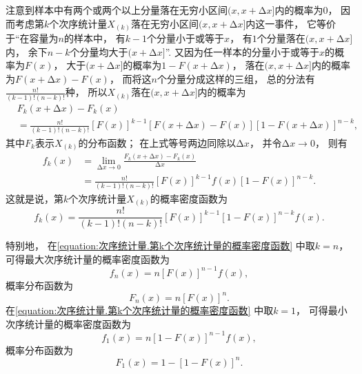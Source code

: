 注意到样本中有两个或两个以上分量落在无穷小区间\((x,x+\increment x]\)内的概率为\(0\)，
因而考虑第\(k\)个次序统计量\(X_{(k)}\)落在无穷小区间\((x,x+\increment x]\)内这一事件，
它等价于“在容量为\(n\)的样本中，
有\(k-1\)个分量小于或等于\(x\)，
有\(1\)个分量落在\((x,x+\increment x]\)内，
余下\(n-k\)个分量均大于\((x+\increment x]\)”.
又因为任一样本的分量小于或等于\(x\)的概率为\(F(x)\)，
大于\((x+\increment x]\)的概率为\(1 - F(x+\increment x)\)，
落在\((x,x+\increment x]\)内的概率为\(F(x+\increment x) - F(x)\)，
而将这\(n\)个分量分成这样的三组，
总的分法有\(\frac{n!}{(k-1)! (n-k)!}\)种，
所以\(X_{(k)}\)落在\((x,x+\increment x]\)内的概率为
\begin{align*}
	&F_k(x+\increment x) - F_k(x) \\
	&= \frac{n!}{(k-1)! (n-k)!} [F(x)]^{k-1} [F(x+\increment x) - F(x)] [1-F(x+\increment x)]^{n-k},
\end{align*}
其中\(F_k\)表示\(X_{(k)}\)的分布函数；
在上式等号两边同除以\(\increment x\)，
并令\(\increment x\to0\)，
则有\begin{align*}
	f_k(x)
	&= \lim_{\increment x\to0} \frac{F_k(x+\increment x) - F_k(x)}{\increment x} \\
	&= \frac{n!}{(k-1)! (n-k)!} [F(x)]^{k-1} f(x) [1-F(x)]^{n-k}.
\end{align*}
这就是说，第\(k\)个次序统计量\(X_{(k)}\)的概率密度函数为
\begin{equation}\label{equation:次序统计量.第k个次序统计量的概率密度函数}
	f_k(x)
	= \frac{n!}{(k-1)! (n-k)!} [F(x)]^{k-1} [1-F(x)]^{n-k} f(x).
\end{equation}

特别地，
在\cref{equation:次序统计量.第k个次序统计量的概率密度函数} 中取\(k=n\)，
可得最大次序统计量的概率密度函数为
\begin{equation}
	f_n(x)
	= n [F(x)]^{n-1} f(x),
\end{equation}
概率分布函数为
\begin{equation}
	F_n(x)
	= n [F(x)]^n.
\end{equation}
在\cref{equation:次序统计量.第k个次序统计量的概率密度函数} 中取\(k=1\)，
可得最小次序统计量的概率密度函数为
\begin{equation}
	f_1(x)
	= n [1-F(x)]^{n-1} f(x),
\end{equation}
概率分布函数为
\begin{equation}
	F_1(x)
	= 1 - [1 - F(x)]^n.
\end{equation}

